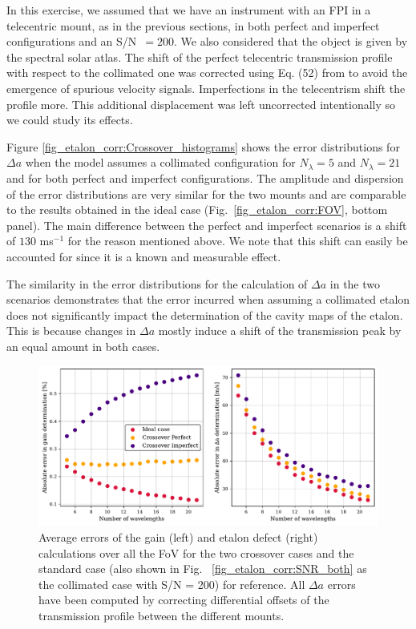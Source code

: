 In this exercise, we assumed that we have an instrument with an FPI in a telecentric mount, as in the previous sections, in both perfect and imperfect configurations and an S/N~$=200$. We also considered that the object is given by the spectral solar atlas. The shift of the perfect telecentric transmission profile with respect to the collimated one was corrected using Eq. (52) from \cite{franI} to avoid the emergence of spurious velocity signals. Imperfections in the telecentrism shift the profile more. This additional displacement was left uncorrected intentionally so we could study its effects.

Figure \ref{fig_etalon_corr:Crossover_histograms} shows the error distributions for $\Delta a$ when the model assumes a collimated configuration for $N_\lambda=5$ and $N_\lambda=21$ and for both perfect and imperfect configurations. The amplitude and dispersion of the error distributions are very similar for the two mounts and are comparable to the results obtained in the ideal case (Fig.~\ref{fig_etalon_corr:FOV}, bottom panel). The main difference between the perfect and imperfect scenarios is a shift of $130$ ms$^{-1}$ for the reason mentioned above. We note that this shift can easily be accounted for since it is a known and measurable effect. 

The similarity in the error distributions for the calculation of $\Delta a$ in the two scenarios demonstrates that the error incurred when assuming a collimated etalon does not significantly impact the determination of the cavity maps of the etalon. This is because changes in $\Delta a$ mostly induce a shift of the transmission peak by an equal amount in both cases.

\begin{figure}[t]
  \includegraphics[width=\textwidth]{figures/EtalonPaper/means.pdf}
  \caption[Crossover case errors.]{Average errors of the gain (left) and etalon defect (right) calculations over all the FoV for the two crossover cases and the standard case (also shown in Fig.~ \ref{fig_etalon_corr:SNR_both} as the collimated case with S/N = 200) for reference. All $\Delta a$ errors have been computed by correcting differential offsets of the transmission profile between the different mounts.\label{fig_etalon_corr:crossover}}  
\end{figure}

